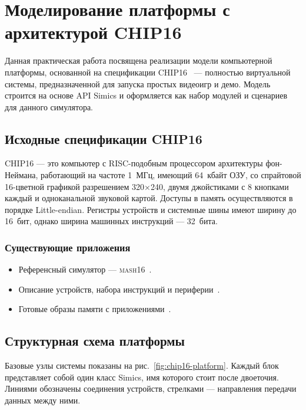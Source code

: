 \chapter{Моделирование платформы с архитектурой CHIP16}\label{chap:lab05}

Данная практическая работа посвящена реализации модели компьютерной платформы, основанной на спецификации CHIP16~\cite{chip16-ngemu} --- полностью виртуальной системы, предназначенной для запуска простых видеоигр и демо. Модель строится на основе API Simics и оформляется как набор модулей и сценариев для данного симулятора.

\section{Исходные спецификации CHIP16}

CHIP16 --- это компьютер с RISC-подобным процессором архитектуры фон-Неймана, работающий на частоте 1~МГц, имеющий 64~кбайт ОЗУ, со спрайтовой 16-цветной графикой разрешением 320×240, двумя джойстиками с 8 кнопками каждый и одноканальной звуковой картой. Доступы в память осуществляются в порядке Little-endian. Регистры устройств и системные шины имеют ширину до 16~бит, однако ширина машинных инструкций — 32~бита.

\subsection{Существующие приложения}

\begin{itemize}
    \item Референсный симулятор --- \textsc{mash16}~\cite{chip16-mach16}.
    \item Описание устройств, набора инструкций и периферии~\cite{chip16-machspec}.
    \item Готовые образы памяти с приложениями~\cite{chip16-roms}.
\end{itemize}

\section{Структурная схема платформы}

Базовые узлы системы показаны на рис.~\ref{fig:chip16-platform}. Каждый блок представляет собой один класс Simics, имя которого стоит после двоеточия. Линиями обозначены соединения устройств, стрелками — направления передачи данных между ними.

